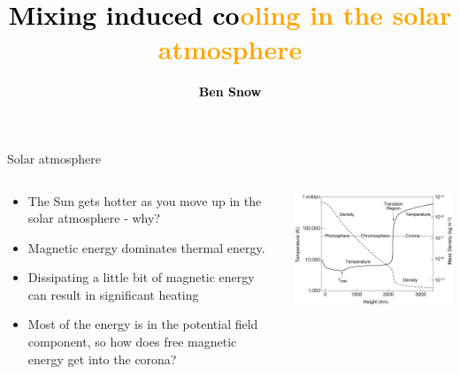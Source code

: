 \documentclass[10pt,aspectratio=169,usenames,dvipsnames]{beamer}
\title{\textcolor{black}{Mixing induced co}\textcolor{orange}{oling in the solar atmosphere}}
\date{}
\author{\textbf{\textcolor{black}{Ben Snow}}}
\institute{\textcolor{black}{University of Exeter} \\ \textcolor{black}{Dundee, 5th March 2023.}}
\begin{document}
\maketitle

\begin{frame}{Solar atmosphere}
\begin{columns}
\begin{column}{0.5\textwidth}
\begin{itemize}
    \item The Sun gets hotter as you move up in the solar atmosphere - why?
    \item Magnetic energy dominates thermal energy.
    \item Dissipating a little bit of magnetic energy can result in significant heating
    \item Most of the energy is in the potential field component, so how does free magnetic energy get into the corona?
\end{itemize}
\end{column}
\begin{column}{0.5\textwidth}
\includegraphics[width=0.95\linewidth]{2023Dundee/Figures/valc.png} \\
\end{column}
\end{columns}
\end{frame}
\end{document}

